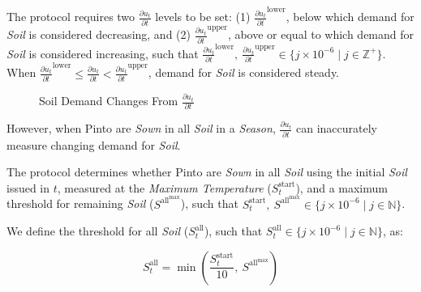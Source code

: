 \documentclass[tikz]{article}
\makeatletter
\newenvironment{keepunit}{%
  \par\penalty0\begingroup
  \edef\keepunitparskip{\the\parskip}%
  \noindent\begin{minipage}[t]{\linewidth}%
  \setlength{\parskip}{\keepunitparskip}%
  \@minipagefalse
}{%
  \end{minipage}\par\endgroup
}
\newcommand{\term}[1]{\textsl{#1}}
\makeatother
\begin{document}
\par{}
\begingroup
\edef\soildemandderivativeparskip{\the\parskip}
\noindent\begin{minipage}[t]{\linewidth}
\setlength{\parskip}{\soildemandderivativeparskip}
\makeatletter\@minipagefalse\makeatother
The protocol requires two $\frac{\partial u_{t}}{\partial t}$ levels to be set: (1) $\frac{\partial u_{t}}{\partial t}^{\text{lower}}$, below which demand for \term{Soil} is considered decreasing, and (2) $\frac{\partial u_{t}}{\partial t}^{\text{upper}}$, above or equal to which demand for \term{Soil} is considered increasing, such that $\frac{\partial u_{t}}{\partial t}^{\text{lower}},\ \frac{\partial u_{t}}{\partial t}^{\text{upper}} \in \{j \times 10^{-6} \mid j \in \mathbb{Z}^{+} \}$. When $\frac{\partial u_{t}}{\partial t}^{\text{lower}} \leq \frac{\partial u_{t}}{\partial t} < \frac{\partial u_{t}}{\partial t}^{\text{upper}}$, demand for \term{Soil} is considered steady.


\begin{figure}[H]
    \centering
    
    \vspace*{-7mm}
    \caption{Soil Demand Changes From $\frac{\partial u_{t}}{\partial t}$}
    \label{Soil Demand Changes From Derivative}
\end{figure}
\end{minipage}\par
\endgroup

However, when Pinto are \term{Sown} in all \term{Soil} in a \term{Season}, $\frac{\partial u_{t}}{\partial t}$ can inaccurately measure changing demand for \term{Soil}.

The protocol determines whether Pinto are \term{Sown} in all \term{Soil} using the initial \term{Soil} issued in $t$, measured at the \term{Maximum Temperature} ($S_t^{\text{start}}$), and a maximum threshold for remaining \term{Soil} ($S^{\text{all}^{\text{max}}}$), such that $S_t^{\text{start}},\ S^{\text{all}^{\text{max}}} \in \{j \times 10^{-6} \mid j \in \mathbb{N} \}$.

\begin{keepunit}
We define the threshold for all \term{Soil} ($S_t^{\text{all}}$), such that $S_t^{\text{all}} \in \{j \times 10^{-6} \mid j \in \mathbb{N} \}$, as:

    $$
        S_t^{\text{all}} = \min\left(\frac{S_t^{\text{start}}}{10},\ S^{\text{all}^{\text{max}}}\right)
    $$
\end{keepunit}
\end{document}
